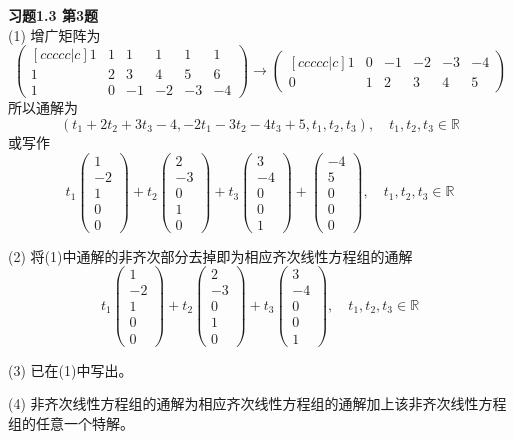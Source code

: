 {\bf 习题1.3 第3题}\\
(1) 增广矩阵为
$$\begin{pmatrix}[ccccc|c] 1 & 1 & 1 & 1 & 1 & 1 \\ 1 & 2 & 3 & 4 & 5 & 6 \\ 1 & 0 & -1 & -2 & -3 & -4 \end{pmatrix}
\to \begin{pmatrix}[ccccc|c] 1 & 0 & -1 & -2 & -3 & -4 \\ 0 & 1 & 2 & 3 & 4 & 5 \end{pmatrix}$$
所以通解为
$$\left( t_1+2t_2+3t_3-4, -2t_1-3t_2-4t_3+5, t_1, t_2, t_3 \right), \quad t_1, t_2, t_3 \in \mathbb{R}$$
或写作
$$t_1\begin{pmatrix} 1 \\ -2 \\ 1 \\ 0 \\ 0 \end{pmatrix} + t_2 \begin{pmatrix} 2 \\ -3 \\ 0 \\ 1 \\ 0 \end{pmatrix} + t_3 \begin{pmatrix} 3 \\ -4 \\ 0 \\ 0 \\ 1 \end{pmatrix} + \begin{pmatrix} -4 \\ 5 \\ 0 \\ 0 \\ 0 \end{pmatrix}, \quad t_1, t_2, t_3 \in \mathbb{R}$$

(2) 将(1)中通解的非齐次部分去掉即为相应齐次线性方程组的通解
$$t_1\begin{pmatrix} 1 \\ -2 \\ 1 \\ 0 \\ 0 \end{pmatrix} + t_2 \begin{pmatrix} 2 \\ -3 \\ 0 \\ 1 \\ 0 \end{pmatrix} + t_3 \begin{pmatrix} 3 \\ -4 \\ 0 \\ 0 \\ 1 \end{pmatrix}, \quad t_1, t_2, t_3 \in \mathbb{R}$$

(3) 已在(1)中写出。

(4) 非齐次线性方程组的通解为相应齐次线性方程组的通解加上该非齐次线性方程组的任意一个特解。


